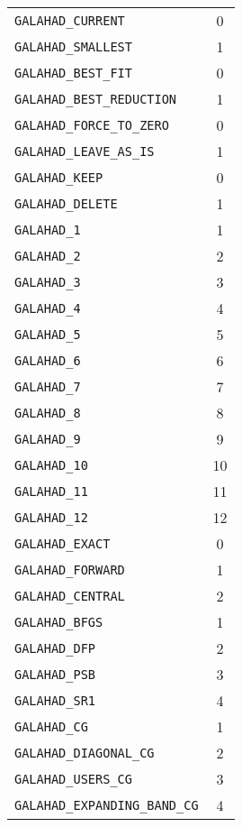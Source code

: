 \documentclass{galahad}
\begin{document}
\begin{figure}[htbp]
\begin{center}
\begin{tabular}{|l|c|}
\hline
{\tt GALAHAD\_CURRENT}              &  0 \\
{\tt GALAHAD\_SMALLEST}             &  1 \\
\hline
{\tt GALAHAD\_BEST\_FIT}            &  0 \\
{\tt GALAHAD\_BEST\_REDUCTION}      &  1 \\
\hline
{\tt GALAHAD\_FORCE\_TO\_ZERO}      &  0 \\
{\tt GALAHAD\_LEAVE\_AS\_IS}        &  1 \\
\hline
{\tt GALAHAD\_KEEP}                 &  0 \\
{\tt GALAHAD\_DELETE}               &  1 \\
\hline
{\tt GALAHAD\_1}                    &  1 \\
{\tt GALAHAD\_2}                    &  2 \\
{\tt GALAHAD\_3}                    &  3 \\
{\tt GALAHAD\_4}                    &  4 \\
{\tt GALAHAD\_5}                    &  5 \\
{\tt GALAHAD\_6}                    &  6 \\
{\tt GALAHAD\_7}                    &  7 \\
{\tt GALAHAD\_8}                    &  8 \\
{\tt GALAHAD\_9}                    &  9 \\
{\tt GALAHAD\_10}                   & 10 \\
{\tt GALAHAD\_11}                   & 11 \\
{\tt GALAHAD\_12    }               & 12 \\
\hline
{\tt GALAHAD\_EXACT}                &  0 \\
{\tt GALAHAD\_FORWARD}              &  1 \\
{\tt GALAHAD\_CENTRAL}              &  2 \\
\hline
{\tt GALAHAD\_BFGS}                 &  1 \\
{\tt GALAHAD\_DFP}                  &  2 \\
{\tt GALAHAD\_PSB}                  &  3 \\
{\tt GALAHAD\_SR1}                  &  4 \\
\hline
{\tt GALAHAD\_CG}                   &  1 \\
{\tt GALAHAD\_DIAGONAL\_CG}         &  2 \\
{\tt GALAHAD\_USERS\_CG}            &  3 \\
{\tt GALAHAD\_EXPANDING\_BAND\_CG}  &  4 \\

\end{tabular}
\end{center}
\end{figure}
\end{document}
